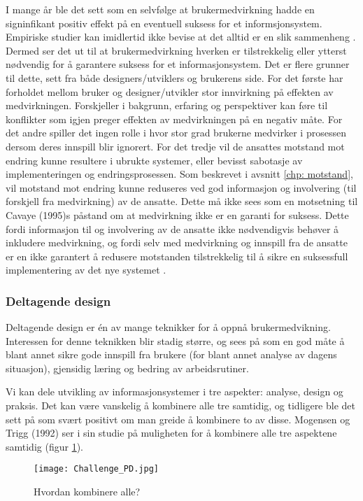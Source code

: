 \noindent
I mange år ble det sett som en selvfølge at brukermedvirkning hadde en signinfikant positiv effekt på en eventuell suksess for et informsjonsystem. Empiriske studier kan imidlertid ikke bevise at det alltid er en slik sammenheng \cite{Cavaye95}. Dermed ser det ut til at brukermedvirkning hverken er tilstrekkelig eller ytterst nødvendig for å garantere suksess for et informasjonsystem. 
Det er flere grunner til dette, sett fra både designers/utviklers og brukerens side. For det første har forholdet mellom bruker og designer/utvikler stor innvirkning på effekten av medvirkningen. Forskjeller i bakgrunn, erfaring og perspektiver kan føre til konflikter som igjen preger effekten av medvirkningen på en negativ måte. For det andre spiller det ingen rolle i hvor stor grad brukerne medvirker i prosessen dersom deres innspill blir ignorert. For det tredje vil de ansattes motstand mot endring kunne resultere i ubrukte systemer, eller bevisst sabotasje av implementeringen og endringsprosessen. Som beskrevet i avsnitt \ref{chp: motstand}, vil motstand mot endring kunne reduseres ved god informasjon og involvering (til forskjell fra medvirkning) av de ansatte. Dette må ikke sees som en motsetning til Cavaye (1995)s påstand om at medvirkning ikke er en garanti for suksess. Dette fordi informasjon til og involvering av de ansatte ikke nødvendigvis behøver å inkludere medvirkning, og fordi selv med medvirkning og innspill fra de ansatte er en ikke garantert å redusere motstanden tilstrekkelig til å sikre en suksessfull implementering av det nye systemet \cite{Cavaye95}.

\subsubsection{Deltagende design}
\label{dd}
Deltagende design er én av mange teknikker for å oppnå brukermedvikning.
Interessen for denne teknikken blir stadig større, og sees på som en god måte å blant annet sikre gode innspill fra brukere (for blant annet analyse av dagens situasjon), gjensidig læring og bedring av arbeidsrutiner.

\noindent
Vi kan dele utvikling av informasjonsystemer i tre aspekter: analyse, design og praksis. Det kan være vanskelig å kombinere alle tre samtidig, og tidligere ble det sett på som svært positivt om man greide å kombinere to av disse. Mogensen og Trigg (1992) ser i sin studie på muligheten for å kombinere alle tre aspektene samtidig (figur \ref{Challenge_PD}).

\begin{figure}[H]
\centering
\texttt{[image: Challenge\_PD.jpg]}
\caption{Hvordan kombinere alle?}
\label{Challenge_PD}
\end{figure}

